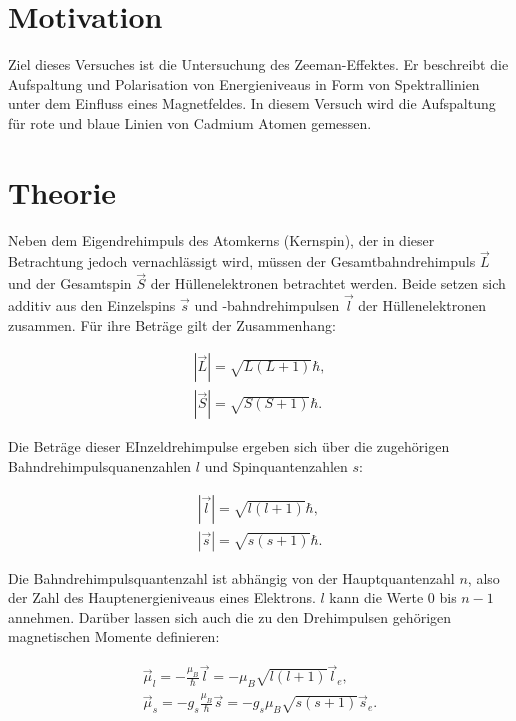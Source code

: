 \section{Motivation}
\label{sec:Motivation}
Ziel dieses Versuches ist die Untersuchung des Zeeman-Effektes. 
Er beschreibt die Aufspaltung und Polarisation von Energieniveaus in Form von 
Spektrallinien unter dem Einfluss eines Magnetfeldes.
In diesem Versuch wird die Aufspaltung für rote und blaue Linien von 
Cadmium Atomen gemessen.

\section{Theorie}
\label{sec:Theorie}

Neben dem Eigendrehimpuls des Atomkerns (Kernspin), der in dieser Betrachtung jedoch 
vernachlässigt wird, müssen der Gesamtbahndrehimpuls $\vec{L}$ und der 
Gesamtspin $\vec{S}$ der Hüllenelektronen betrachtet werden.
Beide setzen sich additiv aus den Einzelspins $\vec{s}$ und -bahndrehimpulsen 
$\vec{l}$ der Hüllenelektronen zusammen. 
Für ihre Beträge gilt der Zusammenhang:

\begin{align}
    |\vec{L}| = \sqrt{L(L+1)}\hbar,\\
    |\vec{S}| = \sqrt{S(S+1)}\hbar.
    \label{eq0}
\end{align}

Die Beträge dieser EInzeldrehimpulse 
ergeben sich über die zugehörigen Bahndrehimpulsquanenzahlen $l$ und 
Spinquantenzahlen $s$:

\begin{align}
    |\vec{l}| = \sqrt{l(l+1)}\hbar,\\
    |\vec{s}| = \sqrt{s(s+1)}\hbar.
    \label{eq1}
\end{align}

Die Bahndrehimpulsquantenzahl ist abhängig von der Hauptquantenzahl $n$, also der 
Zahl des Hauptenergieniveaus eines Elektrons. $l$ kann die Werte 0 bis $n-1$
annehmen. Darüber lassen sich auch die zu den Drehimpulsen gehörigen magnetischen 
Momente definieren:

\begin{align}
    \vec{\mu}_l = - \frac{\mu_B}{\hbar} \vec{l} = - \mu_B \sqrt{l(l+1)} \vec{l}_e,\\
    \vec{\mu}_s = - g_s\frac{\mu_B}{\hbar} \vec{s} = - g_s\mu_B \sqrt{s(s+1)} \vec{s}_e.
    \label{eq2}
\end{align}

